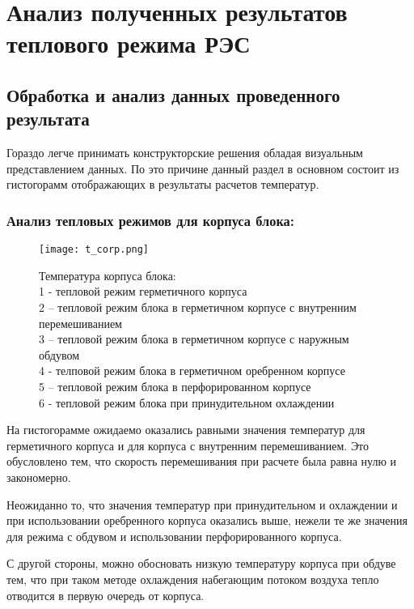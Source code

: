 \section{Анализ полученных результатов теплового режима РЭС}
\subsection{Обработка и анализ данных проведенного результата}

Гораздо легче принимать конструкторские решения обладая визуальным
представлением данных. По это причине данный раздел в основном состоит
из гистогорамм отображающих в результаты расчетов температур.




\subsubsection{Анализ тепловых режимов для корпуса блока:}
\begin{figure}[h] %
\begin{center}
\texttt{[image: t\_corp.png]}
\caption{Температура корпуса блока:\\
  1 - тепловой режим герметичного корпуса\\
  2 – тепловой режим блока в герметичном корпусе с внутренним перемешиванием\\
  3 – тепловой режим блока в герметичном корпусе с наружным обдувом\\
  4 - телповой режим блока в  герметичном оребренном корпусе \\
  5 – тепловой режим блока в перфорированном корпусе \\
  6 - тепловой режим блока при принудительном охлаждении}
\end{center}

\end{figure}

На гистогорамме ожидаемо оказались равными значения температур для
герметичного корпуса и для корпуса с внутренним перемешиванием. Это
обусловлено тем, что скорость перемешивания при расчете была равна
нулю и закономерно.

Неожиданно то, что значения температур при принудительном и охлаждении
и при использовании оребренного корпуса оказались выше, нежели те же
значения для режима с обдувом и использовании перфорированного корпуса.

С другой стороны, можно обосновать низкую температуру корпуса при
обдуве тем, что при таком методе охлаждения набегающим потоком воздуха
тепло отводится в первую очередь от корпуса.

